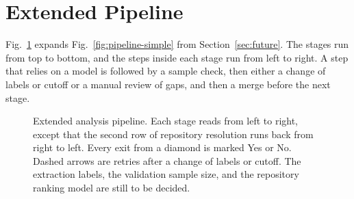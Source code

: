 \section{Extended Pipeline}

Fig.~\ref{fig:pipeline-extended} expands Fig.~\ref{fig:pipeline-simple} from Section~\ref{sec:future}.
The stages run from top to bottom, and the steps inside each stage run from left to right.
A step that relies on a model is followed by a sample check, then either a change of labels or cutoff or a manual review of gaps, and then a merge before the next stage.

\begin{figure}[p]
  \centering
  \resizebox{\textwidth}{!}{}
  \caption{Extended analysis pipeline.
    Each stage reads from left to right, except that the second row of repository resolution runs back from right to left.
    Every exit from a diamond is marked Yes or No.
    Dashed arrows are retries after a change of labels or cutoff.
    The extraction labels, the validation sample size, and the repository ranking model are still to be decided.}
  \label{fig:pipeline-extended}
\end{figure}
